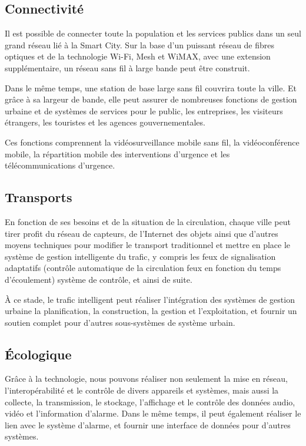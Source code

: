 \subsection{Connectivité}
Il est possible de connecter toute la population et les services publics dans un
seul grand réseau lié à la Smart City.
Sur la base d'un puissant réseau de fibres optiques et de la technologie Wi-Fi, Mesh et WiMAX,
avec une extension supplémentaire, un réseau sans fil à large bande peut être construit.

Dans le même temps, une station de base large sans fil couvrira toute la ville.
Et grâce à sa largeur de bande, elle peut assurer de nombreuses fonctions de gestion urbaine
et de systèmes de services pour le public, les entreprises, les visiteurs étrangers,
les touristes et les agences gouvernementales.

Ces fonctions comprennent la vidéosurveillance mobile sans fil, la vidéoconférence mobile,
la répartition mobile des interventions d'urgence et les télécommunications d'urgence.

\subsection{Transports}

En fonction de ses besoins et de la situation de la circulation,
chaque ville peut tirer profit du réseau de capteurs,
de l'Internet des objets ainsi que d'autres moyens techniques pour modifier le transport
traditionnel et mettre en place le système de gestion intelligente du trafic,
y compris les feux de signalisation adaptatifs (contrôle automatique de la circulation
feux en fonction du temps d'écoulement) système de contrôle, et ainsi de suite.

À ce stade, le trafic intelligent peut réaliser l'intégration des systèmes
de gestion urbaine la planification, la construction, la gestion et l'exploitation, et fournir
un soutien complet pour d'autres sous-systèmes de système urbain.

\subsection{Écologique}

Grâce à la technologie, nous pouvons réaliser non seulement la mise en réseau,
l'interopérabilité et le contrôle de divers appareils et systèmes, mais aussi la collecte,
la transmission, le stockage, l'affichage et le contrôle des données audio, vidéo et l'information d'alarme.
Dans le même temps, il peut également réaliser le lien avec le système d'alarme, et fournir
une interface de données pour d'autres systèmes.

